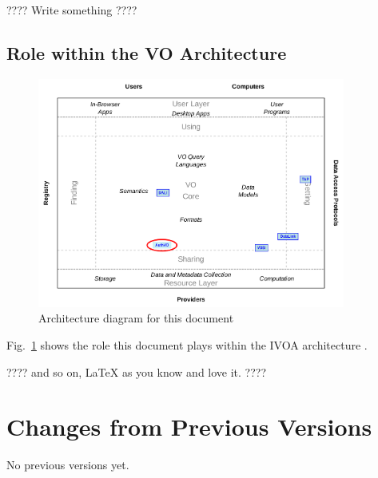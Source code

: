 \documentclass[11pt,a4paper]{ivoa}
\begin{document}
???? Write something ????

\subsection{Role within the VO Architecture}

\begin{figure}
\centering


\includegraphics[width=0.9\textwidth]{role_diagram.pdf}
\caption{Architecture diagram for this document}
\label{fig:archdiag}
\end{figure}

Fig.~\ref{fig:archdiag} shows the role this document plays within the
IVOA architecture \citep{2021ivoa.spec.1101D}.

???? and so on, LaTeX as you know and love it. ????

\appendix
\section{Changes from Previous Versions}

No previous versions yet.



\end{document}
